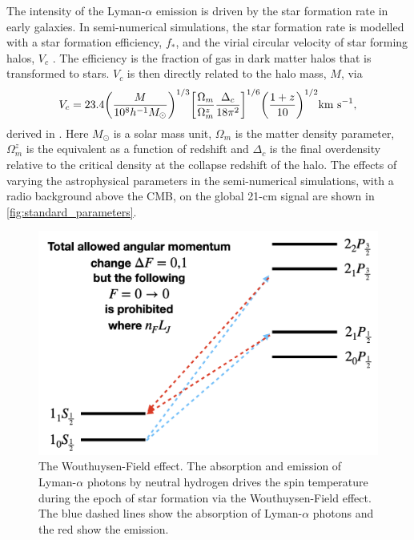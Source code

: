 The intensity of the Lyman-$\alpha$ emission is driven by the star formation rate in early galaxies. In semi-numerical simulations, the star formation rate is modelled with a star formation efficiency, $f_*$, and the virial circular velocity of star forming halos, $V_c$ \cite{Cohen_global_2017}. The efficiency is the fraction of gas in dark matter halos that is transformed to stars. $V_c$ is then directly related to the halo mass, $M$, via
\begin{equation}
    V_c = 23.4 \bigg(\frac{M}{10^8h^{-1}M_\odot}\bigg)^{1/3} \bigg[\frac{\Omega_m}{\Omega_m^z}\frac{\Delta_c}{18\pi^2}\bigg]^{1/6}\bigg(\frac{1+z}{10}\bigg)^{1/2} \textnormal{km~s}^{-1},
\end{equation}
derived in \cite{Barkana_mass_2001}. Here $M_\odot$ is a solar mass unit, $\Omega_m$ is the matter density parameter, $\Omega_m^z$ is the equivalent as a function of redshift and $\Delta_c$ is the final overdensity relative to the critical density at the collapse redshift of the halo. The effects of varying the astrophysical parameters in the semi-numerical simulations, with a radio background above the CMB, on the global 21-cm signal are shown in \cref{fig:standard_parameters}.

\begin{figure}
    \centering
    \includegraphics[width=0.8\linewidth]{introduction/figs/Wouthuysen_field.png}
    \caption{The Wouthuysen-Field effect. The absorption and emission of Lyman-$\alpha$ photons by neutral hydrogen drives the spin temperature during the epoch of star formation via the Wouthuysen-Field effect. The blue dashed lines show the absorption of Lyman-$\alpha$ photons and the red show the emission.}
    \label{fig:wouthuysen_field}
\end{figure}

